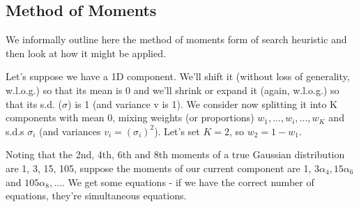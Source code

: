 \documentclass{elsarticle}
\newcommand{\nbb}[2]{
    \fcolorbox{black}{cyan}{\bfseries\sffamily\scriptsize#1}
    {\sf$\blacktriangleright$\textcolor{blue}{\textit{#2}}$\blacktriangleleft$}
}
\newcommand{\alda}[1]{\nbb{Aldeida}{#1}}
\begin{document}
\subsection{Method of Moments}
%
%
%
%
%
%

We informally outline here the method of moments form of search heuristic and then look at how it might be applied.

Let's suppose we have a 1D component.  We'll shift it (without loss of generality, w.l.o.g.) so that its mean is 0 and we'll shrink or expand it (again, w.l.o.g.) so that its s.d. ($\sigma$) is 1 (and variance v is 1).
We consider now splitting it into K components with mean 0,
mixing weights (or proportions) $w_1, ..., w_i, ..., w_K$ and s.d.s $\sigma_i$ (and variances $v_i = (\sigma_i)^2$).
Let's set $K = 2$, so $w_2 = 1 - w_1$.

Noting that the 2nd, 4th, 6th and 8th moments of a true Gaussian distribution are 1, 3, 15, 105,
suppose the moments of our current component are 1, $3 \alpha_4, 15 \alpha_6$ and $105 \alpha_8, ... $.
We get some equations - if we have the correct number of equations,
they're simultaneous equations.
\end{document}
